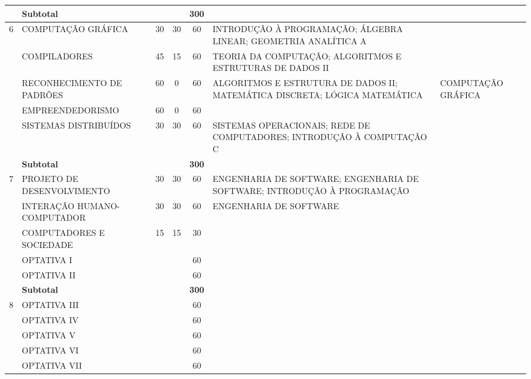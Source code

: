 \documentclass[
	12pt,				%
	openright,			%
  oneside,     %
	a4paper,			%
 hyphens,
	chapter=TITLE,		%
	english,			%
	french,				%
	spanish,			%
	brazil				%
	]{abntex2}
\begin{document}
\begin{center}
\begin{tiny}
\begin{longtable}{cp{4.5cm}cccp{2.8cm}p{2.8cm}}
        & \multicolumn{3}{l}{\textbf{Subtotal}} & \textbf{300} & & \\ \midrule
    6 
        & COMPUTAÇÃO GRÁFICA & 30 & 30 & 60 & INTRODUÇÃO À PROGRAMAÇÃO; \newline ÁLGEBRA LINEAR; \newline GEOMETRIA ANALÍTICA A & \\ \cline{2-7}
        & COMPILADORES & 45 & 15 & 60 & TEORIA DA COMPUTAÇÃO; \newline ALGORITMOS E ESTRUTURAS DE DADOS II & \\ \cline{2-7}
        & RECONHECIMENTO DE PADRÕES & 60 & 0 & 60 & ALGORITMOS E ESTRUTURA DE DADOS II; \newline MATEMÁTICA DISCRETA; \newline LÓGICA MATEMÁTICA & COMPUTAÇÃO GRÁFICA \\ \cline{2-7}
        & EMPREENDEDORISMO & 60 & 0 & 60 & & \\ \cline{2-7}
        & SISTEMAS DISTRIBUÍDOS & 30 & 30 & 60 & SISTEMAS OPERACIONAIS; \newline REDE DE COMPUTADORES; \newline INTRODUÇÃO À COMPUTAÇÃO C & \\ \midrule 
        & \multicolumn{3}{l}{\textbf{Subtotal}} & \textbf{300} & & \\ \midrule
    7 
        & PROJETO DE DESENVOLVIMENTO & 30 & 30 & 60 & ENGENHARIA DE SOFTWARE; \newline ENGENHARIA DE SOFTWARE; \newline INTRODUÇÃO À PROGRAMAÇÃO & \\ \cline{2-7}
        & INTERAÇÃO HU\-MA\-NO-COM\-PU\-TA\-DOR & 30 & 30 & 60 & ENGENHARIA DE SOFTWARE & \\ \cline{2-7}
        & COMPUTADORES E SOCIEDADE & 15 & 15 & 30  & &\\ \cline{2-7}
        & OPTATIVA I & & & 60 & & \\ \cline{2-7}
        & OPTATIVA II & & & 60 & & \\ \midrule
        & \multicolumn{3}{l}{\textbf{Subtotal}} & \textbf{300} & & \\ \midrule
    8
        & OPTATIVA III & & & 60 & & \\ \cline{2-7}
        & OPTATIVA IV & & & 60 & & \\ \cline{2-7}
        & OPTATIVA V & & & 60 & & \\ \cline{2-7}
        & OPTATIVA VI & & & 60 & & \\ \cline{2-7}
        & OPTATIVA VII & & & 60 & & \\ \midrule

\end{longtable}
\end{tiny}
\end{center}
\end{document}
